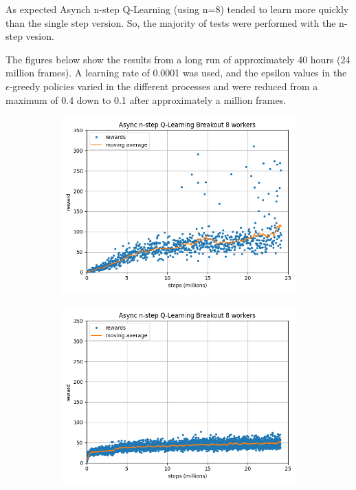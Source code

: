 \documentclass{article}
\begin{document}
As expected Asynch n-step Q-Learning (using n=8) tended to learn more quickly than the single step version. So, the majority of tests were performed with the n-step vesion.

The figures below show the results from a long run of approximately 40 hours (24 million frames). A learning rate of 0.0001 was used, and the epsilon values in the $\epsilon$-greedy policies varied in the different processes and were reduced from a maximum of 0.4 down to 0.1 after approximately a million frames.

\begin{figure}[H]
\centering
\begin{subfigure}{0.49\textwidth}
\centering
\includegraphics[scale=0.4]{"n_step v4 by steps"}
\end{subfigure}
\begin{subfigure}{0.49\textwidth}
\centering
\includegraphics[scale=0.4]{"n_step v5 by steps"}
\end{subfigure}
\label{fig:ASYNC1}
\end{figure}
\end{document}

